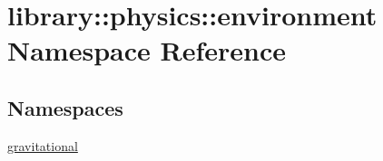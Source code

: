 \hypertarget{namespacelibrary_1_1physics_1_1environment}{}\section{library\+:\+:physics\+:\+:environment Namespace Reference}
\label{namespacelibrary_1_1physics_1_1environment}
\subsection*{Namespaces}
\begin{DoxyCompactItemize}
\item 
 \hyperlink{namespacelibrary_1_1physics_1_1environment_1_1gravitational}{gravitational}
\end{DoxyCompactItemize}
